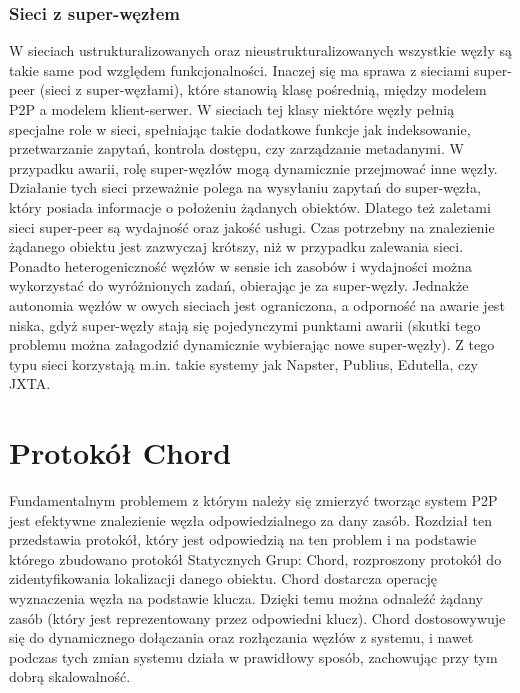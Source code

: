 \documentclass[12pt, twoside, openany]{report}
\begin{document}
\subsection{Sieci z super-węzłem}
W sieciach ustrukturalizowanych oraz nieustrukturalizowanych wszystkie węzły są takie same pod względem funkcjonalności. Inaczej się ma sprawa z sieciami super-peer (sieci z super-węzłami), które stanowią klasę pośrednią, między modelem P2P a modelem klient-serwer. W sieciach tej klasy niektóre węzły pełnią specjalne role w sieci, spełniając takie dodatkowe funkcje jak indeksowanie, przetwarzanie zapytań, kontrola dostępu, czy zarządzanie metadanymi. W przypadku awarii, rolę super-węzłów mogą dynamicznie przejmować inne węzły. Działanie tych sieci przeważnie polega na wysyłaniu zapytań do super-węzła, który posiada informacje o położeniu żądanych obiektów. Dlatego też zaletami sieci super-peer są wydajność oraz jakość usługi. Czas potrzebny na znalezienie żądanego obiektu jest zazwyczaj krótszy, niż w przypadku zalewania sieci. Ponadto heterogeniczność węzłów w sensie ich zasobów i wydajności można wykorzystać do wyróżnionych zadań, obierając je za super-węzły. Jednakże autonomia węzłów w owych sieciach jest ograniczona, a odporność na awarie jest niska, gdyż super-węzły stają się pojedynczymi punktami awarii (skutki tego problemu można załagodzić dynamicznie wybierając nowe super-węzły). Z tego typu sieci korzystają m.in. takie systemy jak Napster, Publius, Edutella, czy JXTA.


\chapter{Protokół Chord}
\label{rozdzial_chord}



Fundamentalnym problemem z którym należy się zmierzyć tworząc system P2P jest efektywne znalezienie węzła odpowiedzialnego za dany zasób. Rozdział ten przedstawia protokół, który jest odpowiedzią na ten problem i na podstawie którego zbudowano protokół Statycznych Grup: Chord, rozproszony protokół do zidentyfikowania lokalizacji danego obiektu. Chord dostarcza operację wyznaczenia węzła na podstawie klucza. Dzięki temu można odnaleźć żądany zasób (który jest reprezentowany przez odpowiedni klucz). Chord dostosowywuje się do dynamicznego dołączania oraz rozłączania węzłów z systemu, i nawet podczas tych zmian systemu działa w prawidłowy sposób, zachowując przy tym dobrą skalowalność.
\end{document}
